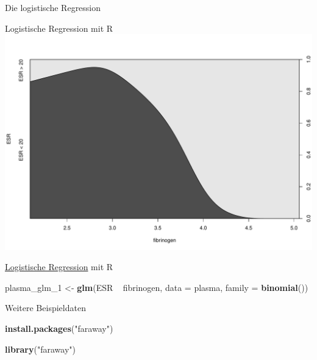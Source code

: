 \documentclass[ignorenonframetext,]{beamer}
\newenvironment{Shaded}{}{}
\newcommand{\KeywordTok}[1]{\textcolor[rgb]{0.00,0.44,0.13}{\textbf{{#1}}}}
\newcommand{\DataTypeTok}[1]{\textcolor[rgb]{0.56,0.13,0.00}{{#1}}}
\newcommand{\StringTok}[1]{\textcolor[rgb]{0.25,0.44,0.63}{{#1}}}
\newcommand{\NormalTok}[1]{{#1}}
\begin{document}
\begin{frame}[fragile]{Die logistische Regression}
\begin{block}{Logistische Regression mit R}
\includegraphics{R_intern_files/figure-beamer/unnamed-chunk-321-1.pdf}

\end{block}

\begin{block}{\href{http://ww2.coastal.edu/kingw/statistics/R-tutorials/logistic.html}{Logistische
Regression} mit R}

\begin{Shaded}
\begin{Highlighting}[]
\NormalTok{plasma_glm_1 <-}\StringTok{ }\KeywordTok{glm}\NormalTok{(ESR ~}\StringTok{ }\NormalTok{fibrinogen, }\DataTypeTok{data =} \NormalTok{plasma, }
                    \DataTypeTok{family =} \KeywordTok{binomial}\NormalTok{())}
\end{Highlighting}
\end{Shaded}

\end{block}

\begin{block}{Weitere Beispieldaten}

\begin{Shaded}
\begin{Highlighting}[]
\KeywordTok{install.packages}\NormalTok{(}\StringTok{"faraway"}\NormalTok{)}
\end{Highlighting}
\end{Shaded}

\begin{Shaded}
\begin{Highlighting}[]
\KeywordTok{library}\NormalTok{(}\StringTok{"faraway"}\NormalTok{)}
\end{Highlighting}
\end{Shaded}


\end{block}
\end{frame}
\end{document}
